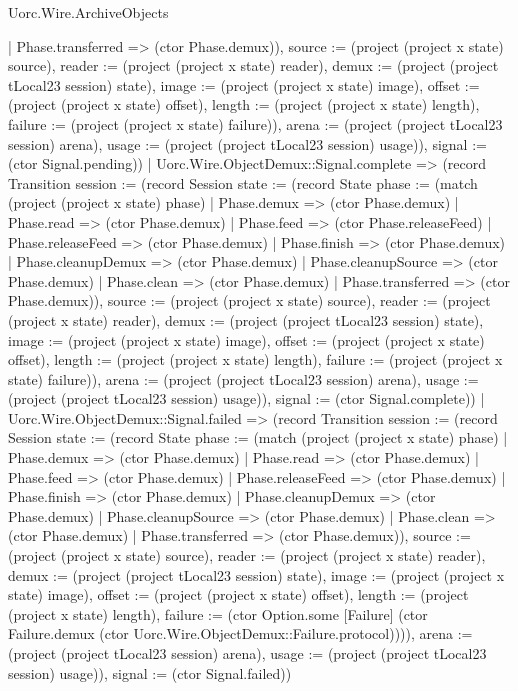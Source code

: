 \begin{lexlean}{Uorc.Wire.ArchiveObjects}
\begin{semanticmodule}
{{{{            | Phase.transferred => (ctor Phase.demux)), source := (project (project x state) source), reader := (project (project x state) reader), demux := (project (project tLocal23 session) state), image := (project (project x state) image), offset := (project (project x state) offset), length := (project (project x state) length), failure := (project (project x state) failure)}), arena := (project (project tLocal23 session) arena), usage := (project (project tLocal23 session) usage)}), signal := (ctor Signal.pending)})
          | Uorc.Wire.ObjectDemux::Signal.complete => (record Transition {session := (record Session {state := (record State {phase := (match (project (project x state) phase)
            | Phase.demux => (ctor Phase.demux)
            | Phase.read => (ctor Phase.demux)
            | Phase.feed => (ctor Phase.releaseFeed)
            | Phase.releaseFeed => (ctor Phase.demux)
            | Phase.finish => (ctor Phase.demux)
            | Phase.cleanupDemux => (ctor Phase.demux)
            | Phase.cleanupSource => (ctor Phase.demux)
            | Phase.clean => (ctor Phase.demux)
            | Phase.transferred => (ctor Phase.demux)), source := (project (project x state) source), reader := (project (project x state) reader), demux := (project (project tLocal23 session) state), image := (project (project x state) image), offset := (project (project x state) offset), length := (project (project x state) length), failure := (project (project x state) failure)}), arena := (project (project tLocal23 session) arena), usage := (project (project tLocal23 session) usage)}), signal := (ctor Signal.complete)})
          | Uorc.Wire.ObjectDemux::Signal.failed => (record Transition {session := (record Session {state := (record State {phase := (match (project (project x state) phase)
            | Phase.demux => (ctor Phase.demux)
            | Phase.read => (ctor Phase.demux)
            | Phase.feed => (ctor Phase.demux)
            | Phase.releaseFeed => (ctor Phase.demux)
            | Phase.finish => (ctor Phase.demux)
            | Phase.cleanupDemux => (ctor Phase.demux)
            | Phase.cleanupSource => (ctor Phase.demux)
            | Phase.clean => (ctor Phase.demux)
            | Phase.transferred => (ctor Phase.demux)), source := (project (project x state) source), reader := (project (project x state) reader), demux := (project (project tLocal23 session) state), image := (project (project x state) image), offset := (project (project x state) offset), length := (project (project x state) length), failure := (ctor Option.some [Failure] (ctor Failure.demux (ctor Uorc.Wire.ObjectDemux::Failure.protocol)))}), arena := (project (project tLocal23 session) arena), usage := (project (project tLocal23 session) usage)}), signal := (ctor Signal.failed)})
}
\end{semanticmodule}
\end{lexlean}
